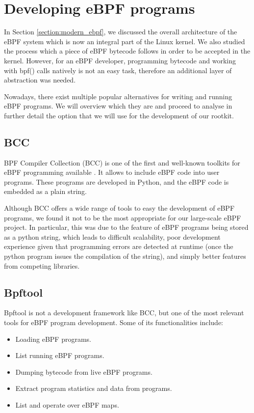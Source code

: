 \section{Developing eBPF programs}
In Section \ref{section:modern_ebpf}, we discussed the overall architecture of the eBPF system which is now an integral part of the Linux kernel. We also studied the process which a piece of eBPF bytecode follows in order to be accepted in the kernel. However, for an eBPF developer, programming bytecode and working with bpf() calls natively is not an easy task, therefore an additional layer of abstraction was needed. 

Nowadays, there exist multiple popular alternatives for writing and running eBPF programs. We will overview which they are and proceed to analyse in further detail the option that we will use for the development of our rootkit.

\subsection{BCC}
BPF Compiler Collection (BCC) is one of the first and well-known toolkits for eBPF programming available \cite{bcc_github}. It allows to include eBPF code into user programs. These programs are developed in Python, and the eBPF code is embedded as a plain string.

Although BCC offers a wide range of tools to easy the development of eBPF programs, we found it not to be the most appropriate for our large-scale eBPF project. In particular, this was due to the feature of eBPF programs being stored as a python string, which leads to difficult scalability, poor development experience given that programming errors are detected at runtime (once the python program issues the compilation of the string), and simply better features from competing libraries.

\subsection{Bpftool}
Bpftool is not a development framework like BCC, but one of the most relevant tools for eBPF program development. Some of its functionalities include:
\begin{itemize}
\item Loading eBPF programs.
\item List running eBPF programs.
\item Dumping bytecode from live eBPF programs.
\item Extract program statistics and data from programs.
\item List and operate over eBPF maps.
\end{itemize}

